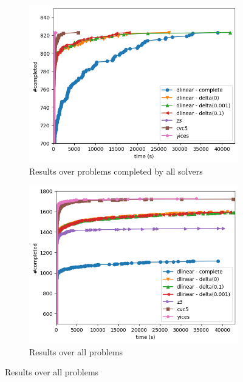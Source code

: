 \documentclass[runningheads]{llncs}
\begin{document}
\begin{figure}[H]
    \centering
    \begin{subfigure}{.46\textwidth}
        \centering
        \includegraphics[width=\linewidth]{img/on_file_smt.png}
        \caption{Results over problems completed by all solvers}
        \label{fig:results-smt1}
    \end{subfigure}%
    \hspace{1cm}
    \begin{subfigure}{.45\textwidth}
        \centering
        \includegraphics[width=\linewidth]{img/total_smt.png}
        \caption{Results over all problems}
        \label{fig:results-smt2}
    \end{subfigure}
\end{figure}
\end{document}
